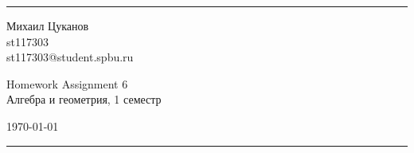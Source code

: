 \documentclass[a4paper, 12pt]{article}
\begin{document}

\fancyhead[C]{}
\hrule \medskip %
\begin{minipage}{0.295\textwidth} 
\raggedright\footnotesize
Михаил Цуканов \hfill\\   
st117303 \hfill\\
st117303@student.spbu.ru
\end{minipage}
\begin{minipage}{0.4\textwidth} 
\centering\large 
Homework Assignment 6\\ 
\normalsize 
Алгебра и геометрия, 1 семестр\\ 
\end{minipage}
\begin{minipage}{0.295\textwidth} 
\raggedleft
\today\hfill\\
\end{minipage}
\medskip\hrule 
\bigskip

\end{document}
